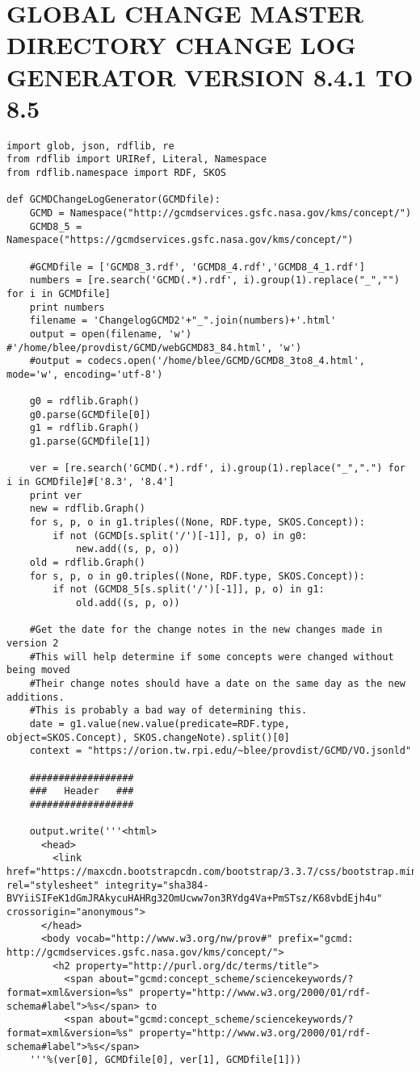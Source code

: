 \chapter{GLOBAL CHANGE MASTER DIRECTORY CHANGE LOG GENERATOR VERSION 8.4.1 TO 8.5} \label{app:gcmd85}
\begin{verbatim}
import glob, json, rdflib, re
from rdflib import URIRef, Literal, Namespace
from rdflib.namespace import RDF, SKOS

def GCMDChangeLogGenerator(GCMDfile):
	GCMD = Namespace("http://gcmdservices.gsfc.nasa.gov/kms/concept/")
	GCMD8_5 = Namespace("https://gcmdservices.gsfc.nasa.gov/kms/concept/")
	
	#GCMDfile = ['GCMD8_3.rdf', 'GCMD8_4.rdf','GCMD8_4_1.rdf']
	numbers = [re.search('GCMD(.*).rdf', i).group(1).replace("_","") for i in GCMDfile]
	print numbers
	filename = 'ChangelogGCMD2'+"_".join(numbers)+'.html'
	output = open(filename, 'w') #'/home/blee/provdist/GCMD/webGCMD83_84.html', 'w')
	#output = codecs.open('/home/blee/GCMD/GCMD8_3to8_4.html', mode='w', encoding='utf-8')
	
	g0 = rdflib.Graph()
	g0.parse(GCMDfile[0])
	g1 = rdflib.Graph()
	g1.parse(GCMDfile[1])
	
	ver = [re.search('GCMD(.*).rdf', i).group(1).replace("_",".") for i in GCMDfile]#['8.3', '8.4']
	print ver
	new = rdflib.Graph()
	for s, p, o in g1.triples((None, RDF.type, SKOS.Concept)):
		if not (GCMD[s.split('/')[-1]], p, o) in g0:
			new.add((s, p, o))
	old = rdflib.Graph()
	for s, p, o in g0.triples((None, RDF.type, SKOS.Concept)):
		if not (GCMD8_5[s.split('/')[-1]], p, o) in g1:
			old.add((s, p, o))
	
	#Get the date for the change notes in the new changes made in version 2
	#This will help determine if some concepts were changed without being moved
	#Their change notes should have a date on the same day as the new additions.
	#This is probably a bad way of determining this.
	date = g1.value(new.value(predicate=RDF.type, object=SKOS.Concept), SKOS.changeNote).split()[0]
	context = "https://orion.tw.rpi.edu/~blee/provdist/GCMD/VO.jsonld"
	
	##################
	###   Header   ###
	##################
	
	output.write('''<html>
	  <head>
	    <link href="https://maxcdn.bootstrapcdn.com/bootstrap/3.3.7/css/bootstrap.min.css" rel="stylesheet" integrity="sha384-BVYiiSIFeK1dGmJRAkycuHAHRg32OmUcww7on3RYdg4Va+PmSTsz/K68vbdEjh4u" crossorigin="anonymous">
	  </head>
	  <body vocab="http://www.w3.org/nw/prov#" prefix="gcmd: http://gcmdservices.gsfc.nasa.gov/kms/concept/">
	    <h2 property="http://purl.org/dc/terms/title">
	      <span about="gcmd:concept_scheme/sciencekeywords/?format=xml&version=%s" property="http://www.w3.org/2000/01/rdf-schema#label">%s</span> to 
	      <span about="gcmd:concept_scheme/sciencekeywords/?format=xml&version=%s" property="http://www.w3.org/2000/01/rdf-schema#label">%s</span>
	'''%(ver[0], GCMDfile[0], ver[1], GCMDfile[1]))
	

\end{verbatim}
